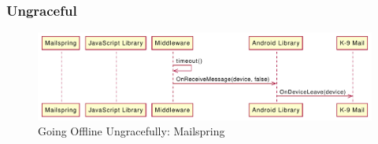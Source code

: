 \subsubsection{Ungraceful}
\begin{figure}
    \includegraphics[width=\linewidth]{../figures/Going-Offline-Ungraceful-Mailspring}
    \centering
    \caption{Going Offline Ungracefully: Mailspring}
    \label{fig:Going-Offline-Ungraceful-Mailspring}
\end{figure}
